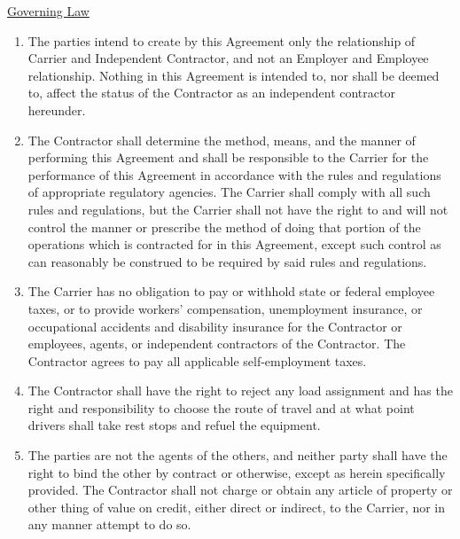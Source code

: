\underline{Governing Law}
\begin{enumerate}[
    ref = \SecondLevelEnumerator
]
    \item The parties intend to create by this Agreement only the
    relationship of Carrier and Independent Contractor, and not an Employer
    and Employee relationship. Nothing in this Agreement is intended to,
    nor shall be deemed to, affect the status of the Contractor as an
    independent contractor hereunder.

    \item The Contractor shall determine the method, means, and the manner
    of performing this Agreement and shall be responsible to the Carrier
    for the performance of this Agreement in accordance with the rules and
    regulations of appropriate regulatory agencies. The Carrier shall
    comply with all such rules and regulations, but the Carrier shall not
    have the right to and will not control the manner or prescribe the
    method of doing that portion of the operations which is contracted for
    in this Agreement, except such control as can reasonably be construed
    to be required by said rules and regulations.

    \item The Carrier has no obligation to pay or withhold state or federal
    employee taxes, or to provide workers' compensation, unemployment
    insurance, or occupational accidents and disability insurance for the
    Contractor or employees, agents, or independent contractors of the
    Contractor. The Contractor agrees to pay all applicable self-employment
    taxes.

    \item The Contractor shall have the right to reject any load assignment
    and has the right and responsibility to choose the route of travel and
    at what point drivers shall take rest stops and refuel the equipment.

    \item The parties are not the agents of the others, and neither party
    shall have the right to bind the other by contract or otherwise, except
    as herein specifically provided. The Contractor shall not charge or
    obtain any article of property or other thing of value on credit,
    either direct or indirect, to the Carrier, nor in any manner attempt to
    do so.
\end{enumerate}